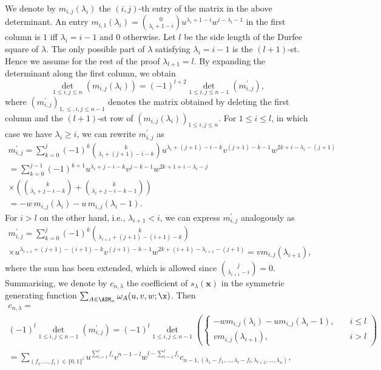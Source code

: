 We denote by $m_{i,j}(\lambda_i)$ the $(i,j)$-th entry of the matrix in the above determinant. An entry $m_{i,1}(\lambda_i)= \binom{0}{\lambda_i+1-i}u^{\lambda_i+1-i} w^{i-\lambda_i-1} $ in the first column is $1$ iff $\lambda_i=i-1$ and $0$ otherwise. Let $l$ be the side length of the Durfee square of $\lambda$. The only possible part of $\lambda$ satisfying $\lambda_i=i-1$ is the $(l+1)$-st. Hence we assume for the rest of the proof $\lambda_{l+1}=l$. By expanding the determinant along the first column, we obtain
\[
\det_{1 \leq i,j \leq n} \left(m_{i,j}(\lambda_i) \right) = (-1)^{l+2}\det_{1 \leq i,j \leq n-1} \left(m_{i,j}^\prime \right),
\]
where $(m_{i,j}^\prime)_{1,\leq,i,j \leq n-1}$ denotes the matrix obtained by deleting the first column and the $(l+1)$-st row of $(m_{i,j}(\lambda_i))_{1\leq i,j \leq n}$. For $1 \leq i \leq l$, in which case we have $\lambda_{i}\geq i$, we can rewrite $m_{i,j}^\prime$ as
\begin{multline*}
m_{i,j}^\prime =
\sum_{k=0}^{j} (-1)^k \binom{k}{\lambda_i+(j+1)-i-k}  u^{\lambda_i+(j+1)-i-k} v^{(j+1)-k-1} w^{2k+i-\lambda_i-(j+1)} \\
= \sum_{k=0}^{j-1} (-1)^{k+1}    u^{\lambda_i+j-i-k}v^{j-k-1} w^{2k+1+i-\lambda_i-j} \\
\times
 \left( \binom{k}{\lambda_i+j-i-k}+ \binom{k}{\lambda_i+j-i-k-1} \right) \\
 = -w \, m_{i,j}(\lambda_i) - u \, m_{i,j}(\lambda_i-1).
\end{multline*}
For $i>l$ on the other hand, i.e., $\lambda_{i+1}<i$, we can express $m_{i,j}^\prime$ analogously as
\begin{multline*}
m_{i,j}^\prime = \sum_{k=0}^{j} (-1)^{k}\binom{k}{\lambda_{i+1}+(j+1)-(i+1)-k} \\
\times  u^{\lambda_{i+1}+(j+1)-(i+1)-k} v^{(j+1)-k-1} w^{2k+(i+1)-\lambda_{i+1}-(j+1)}
=  v m_{i,j}(\lambda_{i+1}),
\end{multline*}
where the sum has been extended, which is allowed since $\binom{j}{\lambda_{i+1}-i}=0$.
Summarising, we denote by $c_{n,\lambda}$ the coefficient of $s_\lambda(\mathbf{x})$ in the symmetric generating function $\sum_{A \in \ASM_n}\omega_A(u,v,w;\x)$. Then
\begin{multline*}
c_{n,\lambda} =\\
 (-1)^{l}\det_{1 \leq i,j \leq n-1} \left(m_{i,j}^\prime \right) 
 = (-1)^{l}\det_{1 \leq i,j \leq n-1} \left( 
\begin{cases}
-w m_{i,j}(\lambda_i)- u m_{i,j}(\lambda_i-1), \quad & i \leq l\\
 v m_{i,j}(\lambda_{i+1}), & i>l
\end{cases} \right) \\
= \sum_{(f_1,\ldots,f_l) \in \{0,1\}^l} u^{\sum_{i=1}^l f_i}  v^{n-1-l} w^{l-\sum_{i=1}^l f_i}
  c_{n-1,(\lambda_1 -f_1,\ldots,\lambda_l-f_l,\lambda_{l+2},\ldots,\lambda_n)},
\end{multline*}
